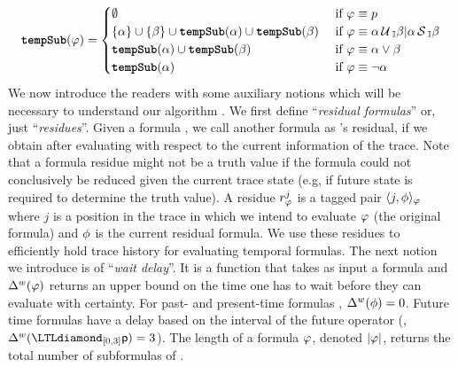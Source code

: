 \[
\textbf{\texttt{tempSub}}(\varphi) = \begin{cases}
\emptyset & \mbox{ if } \varphi \equiv p\\
\{\alpha\} \cup \{\beta\} \cup \textbf{\texttt{tempSub}}(\alpha) \cup \textbf{\texttt{tempSub}}(\beta) & \mbox{ if } \varphi\equiv\alpha\,\mathrm{\cal U}\,_\mathbb{I}\beta|\alpha\,\mathrm{\cal S}\,_\mathbb{I}\beta\\
\textbf{\texttt{tempSub}}(\alpha) \cup \textbf{\texttt{tempSub}}(\beta) & \mbox{ if } \varphi\equiv\alpha\vee\beta\\
\textbf{\texttt{tempSub}}(\alpha) & \mbox{ if }\varphi\equiv\neg\alpha
\end{cases}
\]
We now introduce the readers with some auxiliary notions which will be
necessary to understand our algorithm \monitor. We first define ``\emph{residual formulas}'' or, just ``\emph{residues}''.
Given a formula \policy, we call another formula \policyv as \policy's residual, if we obtain \policyv after evaluating \policy with respect to the current information of the trace.
Note that a formula residue might not be a truth value if the formula could not conclusively be reduced given the current trace state (e.g, if future state is required to determine the truth value).
A residue $r^j_{\varphi}$ is a tagged pair $\langle j, \phi \rangle_{\varphi}$ where $j$ is a position in the trace in which we intend to evaluate $\varphi$ (the original formula) and $\phi$ is the current residual formula. We use these residues to efficiently hold trace history for evaluating temporal formulas.
%
The next notion we introduce is of ``\emph{wait delay}''. It is a function \wdelay that takes as input a formula \policy and
$\Delta^w(\varphi)$ returns
an upper bound on the time one has to wait before they can evaluate \policy with certainty.
For past- and present-time formulas \policyv, $\Delta^w(\phi)=0$.
Future time formulas have a delay based on the interval of the future operator
(\eg, $\wdelay(\eventually_{[0,3]} \pred{p}) = 3$). The length of a formula $\varphi$, denoted $|\varphi|$, returns the total number of subformulas of \policy.



